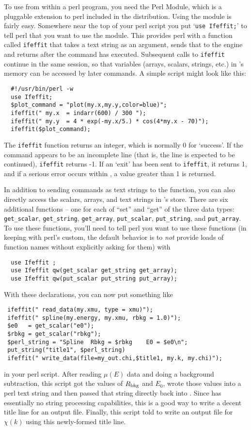 To use {\ifeffit} from within a perl program, you need the {\ifeffit} Perl
Module, which is a pluggable extension to perl included in the {\ifeffit}
distribution.  Using the {\ifeffit} module is fairly easy.  Somewhere near
the top of your perl script you put `{\texttt{use Ifeffit;}}' to tell perl
that you want to use the {\ifeffit} module.  This provides perl with a
function called {\texttt{ifeffit}} that takes a text string as an argument,
sends that to the {\ifeffit} engine and returns after the command has
executed.  Subsequent calls to {\texttt{ifeffit}} continue in the same
{\ifeffit} session, so that variables (arrays, scalars, strings, etc.)  in
{\ifeffit}'s memory can be accessed by later {\ifeffit} commands.  A simple
script might look like this:
\begin{verbatim}
  #!/usr/bin/perl -w
  use Ifeffit;
  $plot_command = "plot(my.x,my.y,color=blue)";
  ifeffit(" my.x  = indarr(600) / 300 ");
  ifeffit(" my.y  = 4 * exp(-my.x/5.) * cos(4*my.x - 70)");
  ifeffit($plot_command);
\end{verbatim}
\noindent   
The {\texttt{ifeffit}} function returns an integer, which is normally 0 for
`success'.  If the command appears to be an incomplete line (that is, the
line is expected to be continued), {\texttt{ifeffit}} returns -1.  If an
`exit' has been sent to {\texttt{ifeffit}}, it returns 1, and if a serious
error occurs within {\ifeffit}, a value greater than 1 is returned.

In addition to sending commands as text strings to the {\ifeffit} function,
you can also directly access the scalars, arrays, and text strings in
{\ifeffit}'s store.  There are six additional functions -- one for each of
``set'' and ``get'' of the three data types: {\tt{get\_scalar}},
{\tt{get\_string}}, {\tt{get\_array}}, {\tt{put\_scalar}},
{\tt{put\_string}}, and {\tt{put\_array}}.  To use these functions, you'll
need to tell perl you want to use these functions (in keeping with perl's
custom, the default behavior is to {\emph{not}} provide loads of function
names without explicitly asking for them) with
\begin{verbatim}
  use Ifeffit ;
  use Ifeffit qw(get_scalar get_string get_array);
  use Ifeffit qw(put_scalar put_string put_array);
\end{verbatim}
\noindent
With these declarations,  you can now put something like
\begin{verbatim}
 ifeffit(" read_data(my.xmu, type = xmu)");
 ifeffit(" spline(my.energy, my.xmu, rbkg = 1.0)");
 $e0   = get_scalar("e0"); 
 $rbkg = get_scalar("rbkg"); 
 $perl_string = "Spline  Rbkg = $rbkg    E0 = $e0\n";
 put_string("title1", $perl_string)
 ifeffit(" write_data(file=my_out.chi,$title1, my.k, my.chi)");
\end{verbatim} %
\noindent
in your perl script.  After reading $\mu(E)$ data and doing a background
subtraction, this script got the values of $R_{\rm bkg}$ and $E_0$, wrote
those values into a perl text string and then passed that string directly
back into {\ifeffit}.  Since {\ifeffit} has essentially no string
processing capabilities, this is a good way to write a decent title line
for an output file.  Finally, this script told {\ifeffit} to write an
output file for $\chi(k)$ using this newly-formed title line.

